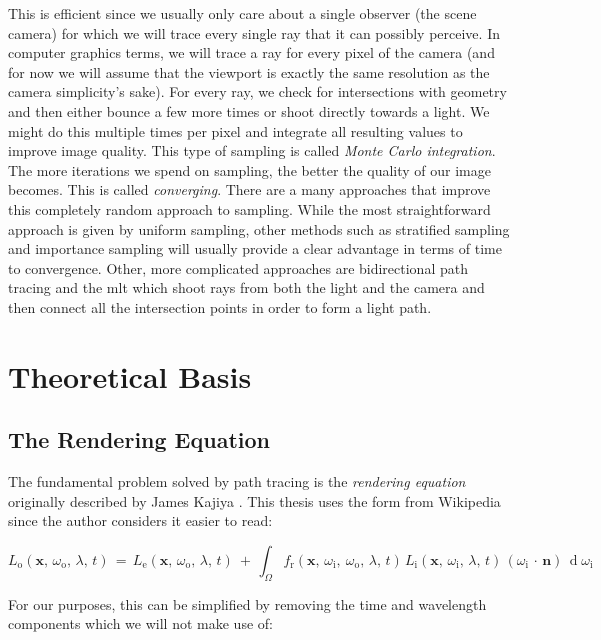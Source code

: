 \documentclass[
  twoside,
  11pt, a4paper,
  footinclude=true,
  headinclude=true,
  cleardoublepage=empty
]{scrreprt}
\begin{document}
This is efficient since we usually only care about a
single observer (the scene camera) for which we will trace every single ray that it can possibly
perceive. In computer graphics terms, we will trace a ray for every pixel of the camera (and for
now we will assume that the viewport is exactly the same resolution as the camera simplicity's
sake). For every ray, we check for intersections with geometry and then either bounce a few more
times or shoot directly towards a light. We might do this multiple times per pixel and integrate
all resulting values to improve image
quality. This type of sampling is called \emph{Monte Carlo integration}.
The more iterations we spend on sampling, the better the
quality of our image becomes. This is called \emph{converging}.
There are a many approaches that improve this completely random approach to sampling. While the
most straightforward approach is given by uniform sampling, other methods such as stratified
sampling \cite{veach1997robust} and importance sampling \cite{veach1997robust} will usually provide
a clear advantage in terms of time to
convergence. Other, more complicated approaches are bidirectional path tracing
\cite{techreport:pbr} and the \ac{mlt} \cite{inproceedings:metropolis} which shoot rays from both
the light and the camera and then connect all the intersection points in order to form a light
path.

\section{Theoretical Basis}
\subsection{The Rendering Equation}
The fundamental problem solved by path tracing is the \emph{rendering equation} originally
described by James Kajiya \cite{inproceedings:pathtracing}. This thesis uses the form from
Wikipedia \cite{wiki:rendering-equation} since the author considers it easier to read:

\[
        L_{\text{o}}(\mathbf x,\, \omega_{\text{o}},\, \lambda,\, t) \,=
        \, L_{\text{e}}(\mathbf x,\, \omega_{\text{o}},\, \lambda,\, t) \ +
        \, \int_\Omega f_{\text{r}}(\mathbf x,\, \omega_{\text{i}},\ \omega_{\text{o}},\, \lambda,\, t)
        \, L_{\text{i}}(\mathbf x,\, \omega_{\text{i}},\, \lambda,\, t)\,
        (\omega_{\text{i}}\,\cdot\,\mathbf n)\, \operatorname d \omega_{\text{i}}
\]

For our purposes, this can be simplified by removing the time and wavelength components which we
will not make use of:
\end{document}
